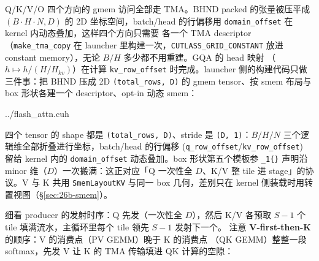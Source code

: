 Q/K/V/O 四个方向的 gmem 访问全部走 TMA。BHND packed 的张量被压平成
$(B\cdot H\cdot N, D)$ 的 2D 坐标空间，batch/head 的行偏移用
\texttt{domain\_\allowbreak{}offset} 在 kernel 内动态叠加，这样四个方向只需要
各一个 TMA descriptor（\texttt{make\_\allowbreak{}tma\_\allowbreak{}copy} 在
launcher 里构建一次，\texttt{CUTLASS\_\allowbreak{}GRID\_\allowbreak{}CONSTANT}
放进 constant memory），无论 $B/H$ 多少都不用重建。GQA 的 head 映射
（$h \mapsto h/(H/H_{kv})$）在计算 \texttt{kv\_\allowbreak{}row\_\allowbreak{}offset}
时完成。launcher 侧的构建代码只做三件事：把 BHND 压成 2D
\texttt{(total\_rows, D)} 的 gmem tensor、按 smem 布局与 box 形状各建一个
descriptor、opt-in 动态 smem：

\begin{lstinputlisting}[linerange={4104-4128},firstnumber=auto,
  title={flash\_attn.cuh L4104-4128（launcher：BHND$\to$2D 压平 + 四方向 TMA descriptor）}]{../flash_attn.cuh}
\end{lstinputlisting}

四个 tensor 的 shape 都是 \texttt{(total\_rows, D)}、stride 是
\texttt{(D, 1)}：$B/H/N$ 三个逻辑维全部折叠进行坐标，batch/head 的行偏移
(\texttt{q\_\allowbreak{}row\_\allowbreak{}offset}/\texttt{kv\_\allowbreak{}row\_\allowbreak{}offset}) 留给 kernel 内的
\texttt{domain\_\allowbreak{}offset} 动态叠加。box 形状第五个模板参 \texttt{\_1\{\}}
声明沿 minor 维（$D$）一次搬满：这正对应「Q 一次性全 $D$、K/V 整 tile
进 stage」的协议。V 与 K 共用 \texttt{SmemLayoutKV} 与同一 box 几何，差别只在
kernel 侧装载时用转置视图（\S\ref{sec:26b-smem}）。

细看 producer 的发射时序：Q 先发（一次性全 $D$），然后
K/V 各预取 $S{-}1$ 个 tile 填满流水，主循环里每个 tile 领先 $S{-}1$ 发射下一个。
注意 \textbf{V-first-then-K} 的顺序：V 的消费点（PV GEMM）晚于 K 的消费点
（QK GEMM）整整一段 softmax，先发 V 让 K 的 TMA 传输填进 QK 计算的空隙：

